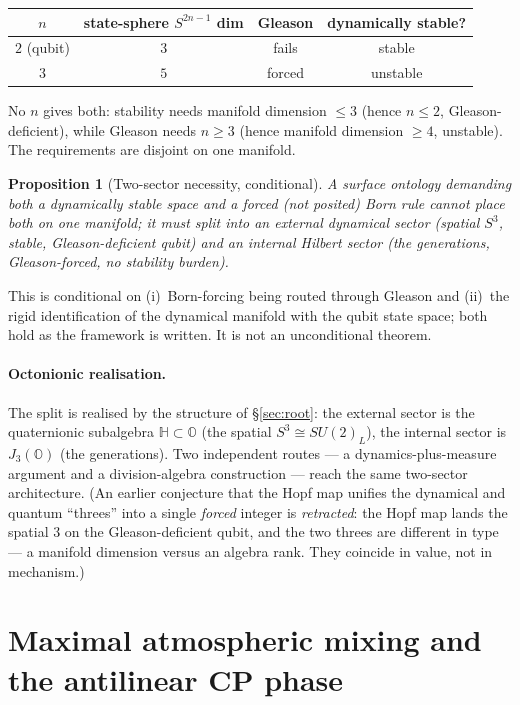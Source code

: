 \documentclass[11pt]{article}
\newtheorem{proposition}{Proposition}
\theoremstyle{definition}
\newcommand{\OO}{\mathbb{O}}
\newcommand{\HH}{\mathbb{H}}
\newcommand{\JthreeO}{J_3(\OO)}
\begin{document}
\begin{center}
\begin{tabular}{cccc}
\toprule
$n$ & state-sphere $S^{2n-1}$ dim & Gleason & dynamically stable? \\
\midrule
$2$ (qubit) & $3$ & fails & stable \\
$3$ & $5$ & forced & unstable \\
\bottomrule
\end{tabular}
\end{center}

\noindent No $n$ gives both: stability needs manifold dimension $\leq3$ (hence $n\leq2$, Gleason-deficient), while Gleason needs $n\geq3$ (hence manifold dimension $\geq4$, unstable). The requirements are disjoint on one manifold.

\begin{proposition}[Two-sector necessity, conditional]
A surface ontology demanding both a dynamically stable space and a \emph{forced} (not posited) Born rule cannot place both on one manifold; it must split into an external dynamical sector (spatial $S^3$, stable, Gleason-deficient qubit) and an internal Hilbert sector (the generations, Gleason-forced, no stability burden).
\end{proposition}

\noindent This is conditional on (i)~Born-forcing being routed through Gleason and (ii)~the rigid identification of the dynamical manifold with the qubit state space; both hold as the framework is written. It is not an unconditional theorem.

\paragraph{Octonionic realisation.} The split is realised by the structure of \S\ref{sec:root}: the external sector is the quaternionic subalgebra $\HH\subset\OO$ (the spatial $S^3\cong SU(2)_L$), the internal sector is $\JthreeO$ (the generations). Two independent routes --- a dynamics-plus-measure argument and a division-algebra construction --- reach the same two-sector architecture. (An earlier conjecture that the Hopf map unifies the dynamical and quantum ``threes'' into a single \emph{forced} integer is \emph{retracted}: the Hopf map lands the spatial $3$ on the Gleason-deficient qubit, and the two threes are different in type --- a manifold dimension versus an algebra rank. They coincide in value, not in mechanism.)

\section{Maximal atmospheric mixing and the antilinear CP phase}\label{sec:p4p4d}
\end{document}
